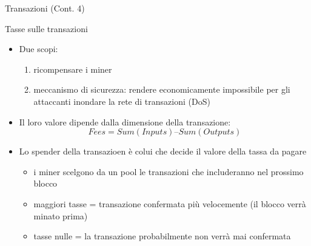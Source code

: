 \documentclass{beamer}
\begin{document}

  \begin{frame}{Transazioni (Cont. 4)}
    \begin{block}{Tasse sulle transazioni}
      \begin{itemize}
        \item Due scopi:
        \begin{enumerate}
          \item ricompensare i miner
          \item meccanismo di sicurezza: rendere economicamente impossibile per gli attaccanti inondare la rete di transazioni (DoS) 
        \end{enumerate}
        \item Il loro valore dipende dalla dimensione della transazione: 
        \[ Fees = Sum(Inputs)–Sum(Outputs) \] 
        \item Lo spender della transazioen è colui che decide il valore della tassa da pagare
        \begin{itemize}
            \item i miner scelgono da un pool le transazioni che includeranno nel prossimo blocco
            \item maggiori tasse = transazione confermata più velocemente (il blocco verrà minato prima) 
            \item tasse nulle = la transazione probabilmente non verrà mai confermata
        \end{itemize}
      \end{itemize}
    \end{block}
  \end{frame}
\end{document}

